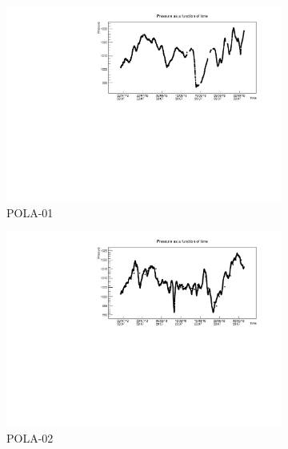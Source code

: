\documentclass[12pt,a4paper]{amsart}
\begin{document}
\begin{figure}
\centering
	\begin{subfigure}[b]{\textwidth}
	\centering
		\includegraphics[width=\textwidth]{../data/plots/POLA-01/pressure_POLA-01.pdf}
		\caption{POLA-01}
		\label{fig:pressure_POLA-01}
	\end{subfigure}
	\begin{subfigure}[b]{0.6\textwidth}
	\centering
		\includegraphics[width=\textwidth]{../data/plots/POLA-02/pressure_POLA-02.pdf}
		\caption{POLA-02}
		\label{fig:pressure_POLA-02}
	\end{subfigure}%
	\begin{subfigure}[b]{0.6\textwidth}
	\centering

\end{subfigure}
\end{figure}
\end{document}
